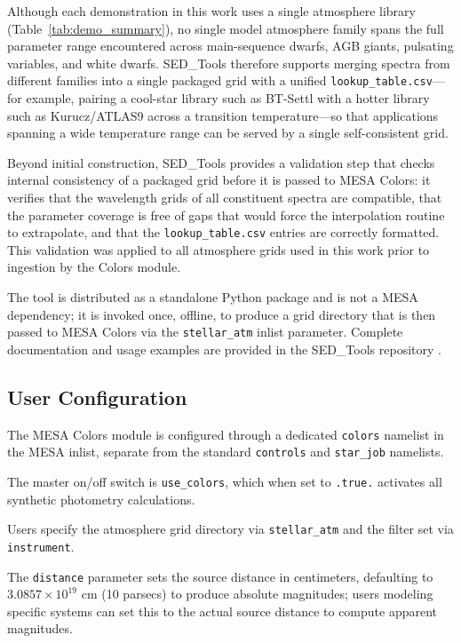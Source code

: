 \documentclass[linenumbers,apj,twocolumn, floatfix]{aastex701}
\begin{document}
Although each demonstration in this work uses a single atmosphere library (Table~\ref{tab:demo_summary}), no single model atmosphere family spans the full parameter range encountered across main-sequence dwarfs, AGB giants, pulsating variables, and white dwarfs. SED\_Tools therefore supports merging spectra from different families into a single packaged grid with a unified \texttt{lookup\_table.csv}---for example, pairing a cool-star library such as BT-Settl with a hotter library such as Kurucz/ATLAS9 across a transition temperature---so that applications spanning a wide temperature range can be served by a single self-consistent grid.

Beyond initial construction, SED\_Tools provides a validation step that checks internal consistency of a packaged grid before it is passed to MESA Colors: it verifies that the wavelength grids of all constituent spectra are compatible, that the parameter coverage is free of gaps that would force the interpolation routine to extrapolate, and that the \texttt{lookup\_table.csv} entries are correctly formatted. This validation was applied to all atmosphere grids used in this work prior to ingestion by the Colors module.

The tool is distributed as a standalone Python package and is not a MESA dependency; it is invoked once, offline, to produce a grid directory that is then passed to MESA Colors via the \texttt{stellar\_atm} inlist parameter. Complete documentation and usage examples are provided in the SED\_Tools repository \citep{SED_Tools}.



\subsection{User Configuration}
\label{sec:user_workflow}

The MESA Colors module is configured through a dedicated \texttt{colors} namelist in the MESA inlist, separate from the standard \texttt{controls} and \texttt{star\_job} namelists. 

The master on/off switch is \texttt{use\_colors}, which when set to \texttt{.true.} activates all synthetic photometry calculations. 

Users specify the atmosphere grid directory via \texttt{stellar\_atm} and the filter set via \texttt{instrument}. 

The \texttt{distance} parameter sets the source distance in centimeters, defaulting to $3.0857 \times 10^{19}$ cm (10 parsecs) to produce absolute magnitudes; users modeling specific systems can set this to the actual source distance to compute apparent magnitudes.
\end{document}
